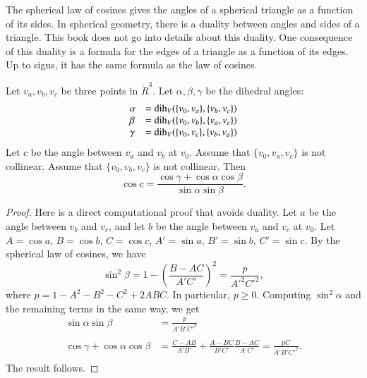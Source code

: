 The spherical law of cosines gives the angles of a spherical
triangle as a function of its sides.  In spherical geometry,
there is a duality between angles and sides of a triangle.
This book does not go into details about this duality.  One
consequence of this duality is a formula for the edges of
a triangle as a function of its edges.  Up to signs,
it has the same formula as the law of cosines.

\begin{lemma}
Let $v_a,v_b,v_c$ be three points in $\ring{R}^3$.
Let $\alpha,\beta,\gamma$ be the dihedral angles: 
   $$
   \begin{array}{lll}
     \alpha &= \operatorname{dih}_V(\{v_0,v_a\},\{v_b,v_c\})\\
     \beta &= \operatorname{dih}_V(\{v_0,v_b\},\{v_a,v_c\})\\
     \gamma&= \operatorname{dih}_V(\{v_0,v_c\},\{v_b,v_a\})\\
     \end{array}
   $$
Let $c$ be the
angle between $v_a$ and $v_b$ at $v_0$. 
Assume that $\{v_0,v_a,v_c\}$ is not
collinear. Assume that $\{v_0,v_b,v_c\}$ is not collinear.
Then
    $$
    \cos c = \frac{\cos \gamma + \cos \alpha \cos \beta}
     {\sin \alpha\sin \beta}.
    $$
\end{lemma}

\begin{proof}  
Here is a direct
computational proof that avoids duality.
Let $a$ be the angle between $v_b$ and $v_c$, and let $b$ be the angle
between $v_a$ and $v_c$ at $v_0$.
Let $A=\cos a$, $B=\cos b$, $C=\cos c$,
$A'=\sin a$, $B'=\sin b$, $C'=\sin c$.  By the
spherical law of cosines, we have
   $$\sin^2\beta = 1-\left(\frac{B-A C}{A' C'}\right)^2
     = \frac{p}{A'^2 C'^2},$$
where $p=1-A^2 - B^2 - C^2 + 2 A B C$.
In particular, $p\ge 0$.
Computing $\sin^2\alpha$ and the remaining terms in the same way, we get
   $$
   \begin{array}{lll}
     \sin\alpha\sin\beta &= \frac{p}{A' B' C'^2}\\ 
      \\
     \cos\gamma + \cos\alpha \cos\beta &=
         \frac{C - A B}{A' B'} + \frac{A - B C}{B' C'} \frac{B - A C}{A' C'}
         = \frac{p C}{A' B' C'^2}.\\
   \end{array}
   $$
The result follows.
\end{proof}


